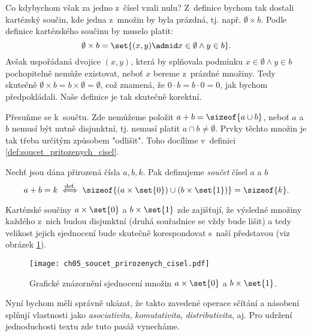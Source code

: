 Co kdybychom však za jedno z~čísel vzali nulu? Z~definice bychom tak dostali kartézský součin, kde jedna z~množin by byla prázdná, tj. např. $\emptyset\times b$. Podle definice kartézského součinu by muselo platit:
\begin{equation*}
    \emptyset\times b=\set{(x,y) \admid x\in\emptyset \land y\in b}.
\end{equation*}
Avšak uspořádaná dvojice $(x,y)$, která by splňovala podmínku $x\in\emptyset \land y\in b$ pochopitelně nemůže existovat, neboť $x$ bereme z~prázdné množiny. Tedy skutečně $\emptyset\times b=b\times\emptyset=\emptyset$, což znamená, že $0\cdot b=b\cdot 0=0$, jak bychom předpokládali. Naše definice je tak skutečně korektní.\par
Přesuňme se k~součtu. Zde nemůžeme položit $a+b=\sizeof{a\cup b}$, neboť $a$ a $b$ nemusí být nutně disjunktní, tj. nemusí platit $a\cap b\neq\emptyset$. Prvky těchto množin je tak třeba určitým způsobem "odlišit". Toho docílíme v~definici \ref{def:soucet_pritozenych_cisel}.
\begin{definition}\label{def:soucet_pritozenych_cisel}
    Nechť jsou dána přirozená čísla $a,b,k$. Pak definujeme \emph{součet} čísel $a$ a $b$
    \begin{equation*}
        a+b=k\stackrel{\text{def.}}{\iff} \sizeof{(a\times\set{0})\cup (b\times\set{1})}=\sizeof{k}.
    \end{equation*}
\end{definition}
Kartézské součiny $a\times\set{0}$ a $b\times\set{1}$ zde zajišťují, že výsledné množiny každého z~nich budou disjunktní (druhá souřadnice se vždy bude lišit) a tedy velikost jejich sjednocení bude skutečně korespondovat s~naší představou (viz obrázek \ref{fig:soucet_prirozenych_cisel}).
\begin{figure}[H]
	\centering
	\texttt{[image: ch05\_soucet\_prirozenych\_cisel.pdf]}
    \caption{Grafické znázornění sjednocení množin $a\times\set{0}$ a $b\times\set{1}$.}
    \label{fig:soucet_prirozenych_cisel}
\end{figure}
Nyní bychom měli správně ukázat, že takto zavedené operace sčítání a násobení splňují vlastnosti jako \emph{asociativita}, \emph{komutativita}, \emph{distributivita}, aj. Pro udržení jednoduchosti textu zde tuto pasáž vynecháme.